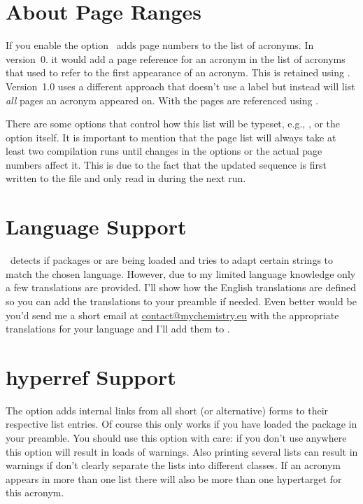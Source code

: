 \documentclass[load-preamble+,scrartcl={DIV10}]{cnltx-doc}
\makeatletter
\newcommand\versionstar{\texorpdfstring{\@versionstar}{*}}
\makeatother
\begin{document}
\section{About Page Ranges}
If you enable the  option \acro\ adds page numbers to the list
of acronyms.  In version~0.\versionstar{} it would add a page reference for an
acronym in the list of acronyms that used  to refer to the first
appearance of an acronym.  This is retained using .
Version~1.0 uses a different approach that doesn't use a label but instead
will list \emph{all} pages an acronym appeared on.  With  the
pages are referenced using .

There are some options that control how this list will be typeset, e.g.,
,  or the option 
itself.  It is important to mention that the page list will always take at
least two compilation runs until changes in the options or the actual page
numbers affect it.  This is due to the fact that the updated sequence is first
written to the  file and only read in during the next run.


\section{Language Support}
\acro\ detects if packages  or  are being loaded
and tries to adapt certain strings to match the chosen language.  However, due
to my limited language knowledge only a few translations are provided.  I'll
show how the English translations are defined so you can add the translations
to your preamble if needed.  Even better would be you'd send me a short email
at \href{mailto:contact@mychemistry.eu}{contact@mychemistry.eu} with the
appropriate translations for your language and I'll add them to \acro.

\begin{sourcecode}
\end{sourcecode}

\section{hyperref Support}
The option  adds internal links from all short (or
alternative) forms to their respective list entries.  Of course this only
works if you have loaded the  package in your preamble.  You
should use this option with care: if you don't use  anywhere
this option will result in loads of  warnings.  Also printing
several lists can result in warnings if don't clearly separate the lists into
different classes.  If an acronym appears in more than one list there will
also be more than one hypertarget for this acronym.
\end{document}
